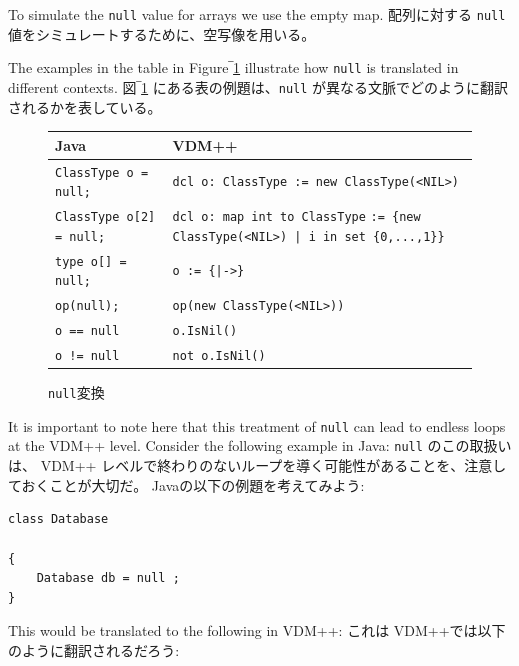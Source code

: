 \documentclass[\pformat,12pt]{jarticle}
\newcommand{\JAVA}{Java}
\newcommand{\VDM}{VDM++}
\begin{document}
To simulate the \texttt{null} value for arrays we use the empty map. 
配列に対する \texttt{null} 値をシミュレートするために、空写像を用いる。 

The examples in the table in Figure‾\ref{fig:nullxfs} illustrate how
\texttt{null} is translated in different contexts.
 図‾\ref{fig:nullxfs} にある表の例題は、\texttt{null} が異なる文脈でどのように翻訳されるかを表している。

\begin{figure}[htbp]
  \begin{center}
\begin{longtable}{|l|p{7cm}|}
\hline
  \JAVA\   & \VDM\ \\ \hline \hline
  \texttt{ClassType o = null;}      & \texttt{dcl o: ClassType := new ClassType(<NIL>)}    \\ \hline
  \texttt{ClassType o[2] = {null};} & \texttt{dcl o: map int to ClassType}
                                      \texttt{:= \{new ClassType(<NIL>) | i in set \{0,...,1\}\}}    \\ \hline
  \texttt{type o[] = null;}         & \texttt{o := \{|->\}}    \\ \hline
  \texttt{op(null);}                & \texttt{op(new ClassType(<NIL>))}    \\ \hline
  \texttt{o == null}                & \texttt{o.IsNil()}    \\ \hline
  \texttt{o != null}                & \texttt{not o.IsNil()}    \\ \hline
\end{longtable}    
    \caption{\texttt{null}変換}
    \label{fig:nullxfs}
  \end{center}
\end{figure}

It is important to note here that this treatment of \texttt{null} can
lead to endless loops at the VDM++ level. Consider the following
example in Java:
 \texttt{null} のこの取扱いは、 VDM++ レベルで終わりのないループを導く可能性があることを、注意しておくことが大切だ。
Javaの以下の例題を考えてみよう:

\begin{small}
\begin{verbatim}
class Database

{
    Database db = null ;
}
\end{verbatim}
\end{small}

This would be translated to the following in VDM++:
これは VDM++では以下のように翻訳されるだろう:
\end{document}
